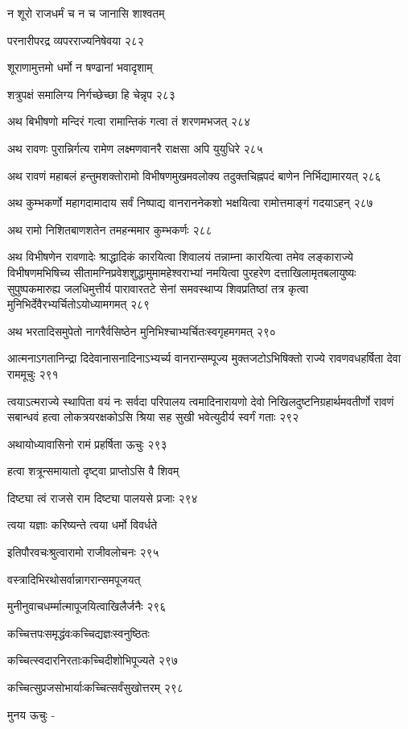 न शूरो राजधर्मं च न च जानासि शाश्वतम्

परनारीपरद्र व्यपरराज्यनिषेवया २८२

शूराणामुत्तमो धर्मो न षण्ढानां भवादृशाम्

शत्रुपक्षं समालिग्य निर्गच्छेच्छा हि चेन्नृप २८३

अथ बिभीषणो मन्दिरं गत्वा रामान्तिकं गत्वा तं शरणमभजत् २८४

अथ रावणः पुरान्निर्गत्य रामेण लक्ष्मणवानरै राक्षसा अपि युयुधिरे २८५

अथ रावणं महाबलं हन्तुमशक्तोरामो विभीषणमुखमवलोक्य तदुक्तचिह्नपदं बाणेन निर्भिद्यामारयत्
 २८६

अथ कुम्भकर्णो महागदामादाय सर्वं निष्पाद्य वानराननेकशो भक्षयित्वा रामोत्तमाङ्गं
गदयाऽहन् २८७

अथ रामो निशितबाणशतेन तमहन्ममार कुम्भकर्णः २८८

अथ विभीषणेन रावणादेः श्राद्धादिकं कारयित्वा शिवालयं तन्नाम्ना कारयित्वा तमेव
लङ्काराज्ये विभीषणमभिषिच्य सीतामग्निप्रवेशशुद्धामुमामहेश्वराभ्यां नमयित्वा पुरहरेण
दत्ताखिलामृतबलायुष्यः सुपुष्पकमारुह्य जलधिमुत्तीर्य पारावारतटे सेनां समवस्थाप्य
शिवप्रतिष्ठां तत्र कृत्वा मुनिभिर्देवैरभ्यर्चितोऽयोध्यामगमत् २८९

अथ भरतादिसमुपेतो नागरैर्वसिष्ठेन मुनिभिश्चाभ्यर्चितःस्वगृहमगमत् २९०

आत्मनाऽगतानिन्द्रा दिदेवानासनादिनाऽभ्यर्च्य वानरान्सम्पूज्य मुक्तजटोऽभिषिक्तो राज्ये
रावणवधहर्षिता देवा राममूचुः २९१

त्वयाऽत्मराज्ये स्थापिता वयं नः सर्वदा परिपालय त्वमादिनारायणो देवो
निखिलदुष्टनिग्रहार्थमवतीर्णो रावणं सबान्धवं हत्वा लोकत्रयरक्षकोऽसि श्रिया सह सुखी
भवेत्युदीर्य स्वर्गं गताः २९२

अथायोध्यावासिनो रामं प्रहर्षिता ऊचुः २९३

हत्वा शत्रून्समायातो दृष्ट्वा प्राप्तोऽसि वै शिवम्

दिष्ट्या त्वं राजसे राम दिष्ट्या पालयसे प्रजाः २९४

त्वया यज्ञाः करिष्यन्ते त्वया धर्मो विवर्धते

इतिपौरवचःश्रुत्वारामो राजीवलोचनः २९५

वस्त्रादिभिरथोसर्वान्नागरान्समपूजयत्

मुनीनुवाचधर्म्मात्मापूजयित्वाखिलैर्जनैः २९६

कच्चित्तपःसमृद्धंवःकच्चिद्यज्ञःस्वनुष्ठितः

कच्चित्स्वदारनिरताःकच्चिदीशोभिपूज्यते २९७

कच्चित्सुप्रजसोभार्याःकच्चित्सर्वंसुखोत्तरम् २९८

मुनय ऊचुः -

